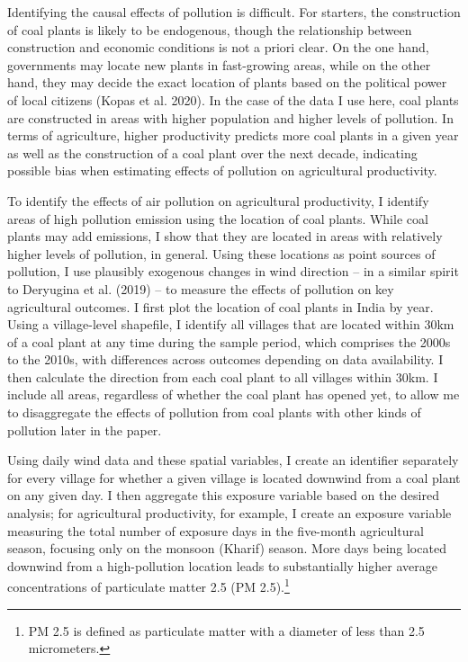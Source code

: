 \documentclass[
]{article}
\begin{document}
Identifying the causal effects of pollution is difficult. For starters, the construction of coal plants is likely to be endogenous, though the relationship between construction and economic conditions is not a priori clear. On the one hand, governments may locate new plants in fast-growing areas, while on the other hand, they may decide the exact location of plants based on the political power of local citizens (Kopas et al. 2020). In the case of the data I use here, coal plants are constructed in areas with higher population and higher levels of pollution. In terms of agriculture, higher productivity predicts more coal plants in a given year as well as the construction of a coal plant over the next decade, indicating possible bias when estimating effects of pollution on agricultural productivity.

To identify the effects of air pollution on agricultural productivity, I identify areas of high pollution emission using the location of coal plants. While coal plants may add emissions, I show that they are located in areas with relatively higher levels of pollution, in general. Using these locations as point sources of pollution, I use plausibly exogenous changes in wind direction -- in a similar spirit to Deryugina et al. (2019) -- to measure the effects of pollution on key agricultural outcomes. I first plot the location of coal plants in India by year. Using a village-level shapefile, I identify all villages that are located within 30km of a coal plant at any time during the sample period, which comprises the 2000s to the 2010s, with differences across outcomes depending on data availability. I then calculate the direction from each coal plant to all villages within 30km. I include all areas, regardless of whether the coal plant has opened yet, to allow me to disaggregate the effects of pollution from coal plants with other kinds of pollution later in the paper.

Using daily wind data and these spatial variables, I create an identifier separately for every village for whether a given village is located downwind from a coal plant on any given day. I then aggregate this exposure variable based on the desired analysis; for agricultural productivity, for example, I create an exposure variable measuring the total number of exposure days in the five-month agricultural season, focusing only on the monsoon (Kharif) season. More days being located downwind from a high-pollution location leads to substantially higher average concentrations of particulate matter 2.5 (PM 2.5).\footnote{PM 2.5 is defined as particulate matter with a diameter of less than 2.5 micrometers.}
\end{document}
